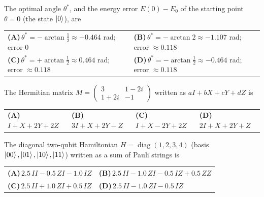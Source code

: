 \documentclass[11pt,a4paper]{article}
\newcommand{\optlabel}[1]{\textbf{(#1)}}
\newenvironment{qitem}[1]{\begin{list}{}{\setlength{\leftmargin}{3.3em}\setlength{\labelwidth}{3.1em}%
  \setlength{\labelsep}{0.2em}\setlength{\topsep}{3pt}\setlength{\parsep}{3pt}}\item[\textbf{Q.#1}\hfill]}{\end{list}}
\newcommand{\qsep}{\par\vspace{2pt}{\color{black!15}\hrule}\vspace{4pt}}
\begin{document}
\begin{qitem}{15}
The optimal angle $\theta^*$, and the energy error $E(0) - E_0$ of the starting point $\theta = 0$ (the state $\ket0$), are
\par\smallskip\noindent\begin{tabularx}{\linewidth}{@{}*{2}{L}@{}}
\optlabel{A}\,$\theta^* = -\arctan\tfrac12 \approx -0.464$ rad; error $0$ & \optlabel{B}\,$\theta^* = -\arctan 2 \approx -1.107$ rad; error $\approx 0.118$ \\[3pt]
\optlabel{C}\,$\theta^* = +\arctan\tfrac12 \approx 0.464$ rad; error $\approx 0.118$ & \optlabel{D}\,$\theta^* = -\arctan\tfrac12 \approx -0.464$ rad; error $\approx 0.118$
\end{tabularx}
\end{qitem}
\qsep

\begin{qitem}{16}
The Hermitian matrix $M = \begin{pmatrix}3 & 1 - 2i\\ 1 + 2i & -1\end{pmatrix}$ written as $aI + bX + cY + dZ$ is
\par\smallskip\noindent\begin{tabularx}{\linewidth}{@{}*{4}{L}@{}}
\optlabel{A}\,$I + X + 2Y + 2Z$ & \optlabel{B}\,$3I + X + 2Y - Z$ & \optlabel{C}\,$I + X - 2Y + 2Z$ & \optlabel{D}\,$2I + X + 2Y + Z$
\end{tabularx}
\end{qitem}
\qsep

\begin{qitem}{17}
The diagonal two-qubit Hamiltonian $H = \operatorname{diag}(1, 2, 3, 4)$ (basis $\ket{00}, \ket{01}, \ket{10}, \ket{11}$) written as a sum of Pauli strings is
\par\smallskip\noindent\begin{tabularx}{\linewidth}{@{}*{2}{L}@{}}
\optlabel{A}\,$2.5\,II - 0.5\,ZI - 1.0\,IZ$ & \optlabel{B}\,$2.5\,II - 1.0\,ZI - 0.5\,IZ + 0.5\,ZZ$ \\[3pt]
\optlabel{C}\,$2.5\,II + 1.0\,ZI + 0.5\,IZ$ & \optlabel{D}\,$2.5\,II - 1.0\,ZI - 0.5\,IZ$
\end{tabularx}
\end{qitem}
\qsep
\end{document}
